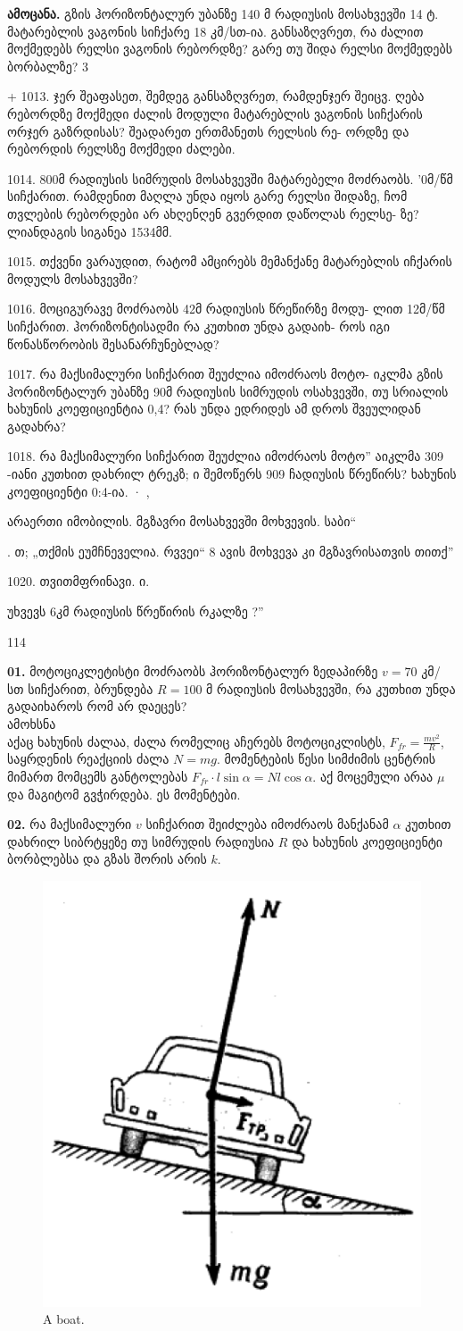 \documentclass{book}
\begin{document}
\textbf{ამოცანა.} გზის ჰორიზონტალურ უბანზე 140 მ რადიუსის მოსახვევში 14 ტ. მატარებლის ვაგონის სიჩქარე 18 კმ/სთ-ია. განსაზღვრეთ, რა ძალით მოქმედებს რელსი ვაგონის რებორდზე? გარე თუ შიდა რელსი მოქმედებს ბორბალზე? 3

+ 1013. ჯერ შეაფასეთ, შემდეგ განსაზღვრეთ, რამდენჯერ შეიცვ.
ღება რებორდზე მოქმედი ძალის მოდული მატარებლის ვაგონის
სიჩქარის ორჯერ გაზრდისას? შეადარეთ ერთმანეთს რელსის რე-
ორდზე და რებორდის რელსზე მოქმედი ძალები.

1014. 800მ რადიუსის სიმრუდის მოსახვევში მატარებელი მოძრაობს.
'0მ/წმ სიჩქარით. რამდენით მაღლა უნდა იყოს გარე რელსი შიდაზე,
ჩომ თვლების რებორდები არ ახღენღენ გვერდით დაწოლას რელსე-
ზე? ლიანდაგის სიგანეა 1534მმ.

1015. თქვენი ვარაუდით, რატომ ამცირებს მემანქანე მატარებლის
იჩქარის მოდულს მოსახვევში?

1016. მოციგურავე მოძრაობს 42მ რადიუსის წრეწირზე მოდუ-
ლით 12მ/წმ სიჩქარით. ჰორიზონტისადმი რა კუთხით უნდა გადაიხ-
როს იგი წონასწორობის შესანარჩუნებლად?

1017. რა მაქსიმალური სიჩქარით შეუძლია იმოძრაოს მოტო-
იკლმა გზის ჰორიზონტალურ უბანზე 90მ რადიუსის სიმრუდის
ოსახვევში, თუ სრიალის ხახუნის კოეფიციენტია 0,4? რას უნდა
ედრიდეს ამ დროს შვეულიდან გადახრა?

1018. რა მაქსიმალური სიჩქარით შეუძლია იმოძრაოს მოტო”
აიკლმა 309 -იანი კუთხით დახრილ ტრეკზ; ი შემოწერს 909
ჩადიუსის წრეწირს? ხახუნის კოეფიციენტი  0:4-ია.  · ,

არაერთი იმობილის. მგზავრი მოსახვევში მოხვევის. საბი“

. თ; „თქმის
ეუმჩნეველია. რვვეი“ 8 ავის მოხვევა კი მგზავრისათვის თითქ”

1020. თვითმფრინავი. ი.

უხვევს 6კმ რადიუსის წრეწირის რკალზე ?''

114


\textbf{01.} მოტოციკლეტისტი მოძრაობს ჰორიზონტალურ ზედაპირზე $v = 70$ კმ/სთ სიჩქარით, ბრუნდება $R = 100$ მ რადიუსის მოსახვევში, რა კუთხით უნდა გადაიხაროს რომ არ დაეცეს? \\
	 ამოხსნა\\
	 აქაც ხახუნის ძალაა, ძალა რომელიც აჩერებს მოტოციკლისტს, $F_{fr} = \frac{m v^2}{R}$, საყრდენის რეაქციის ძალა $N = mg$. მომენტების წესი სიმძიმის ცენტრის მიმართ მომცემს განტოლებას $F_{fr}\cdot l \sin \alpha = N l \cos \alpha$. აქ მოცემული არაა $\mu$ და მაგიტომ გვჭირდება. ეს მომენტები.
	 
	\textbf{02.} რა მაქსიმალური $v$ სიჩქარით შეიძლება იმოძრაოს მანქანამ $\alpha$ კუთხით დახრილ სიბრტყეზე თუ სიმრუდის რადიუსია $R$ და ხახუნის კოეფიციენტი ბორბლებსა და გზას შორის არის $k$.
			\begin{figure}[H]
           \includegraphics[width=0.2\columnwidth]{figures/02}
           \caption{A boat.}
           \label{fig:02}
        \end{figure}
\end{document}
